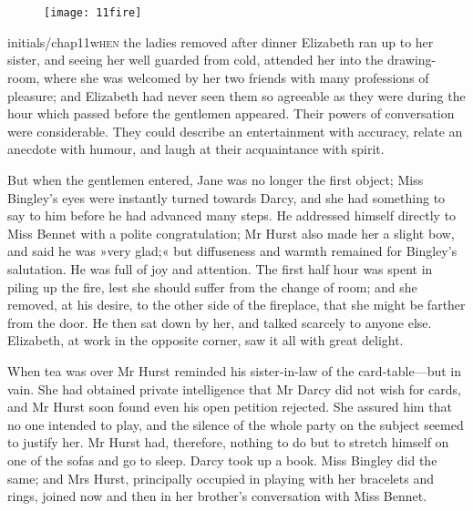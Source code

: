 \chapter[Chapter \thechapter]{}
	
	\begin{figure}[th!]
\centering
\texttt{[image: 11fire]}
\end{figure}

	\lettrine[lines=6,image=true]{initials/chap11w}{hen}  the ladies removed after dinner Elizabeth ran up to her sister, and seeing her well guarded from cold, attended her into the drawing-room, where she was welcomed by her two friends with many professions of pleasure; and Elizabeth had never seen them so agreeable as they were during the hour which passed before the gentlemen appeared. Their powers of conversation were considerable. They could describe an entertainment with accuracy, relate an anecdote with humour, and laugh at their acquaintance with spirit.

But when the gentlemen entered, Jane was no longer the first object; Miss Bingley's eyes were instantly turned towards Darcy, and she had something to say to him before he had advanced many steps. He addressed himself directly to Miss Bennet with a polite congratulation; Mr Hurst also made her a slight bow, and said he was »very glad;« but diffuseness and warmth remained for Bingley's salutation. He was full of joy and attention. The first half hour was spent in piling up the fire, lest she should suffer from the change of room; and she removed, at his desire, to the other side of the fireplace, that she might be farther from the door. He then sat down by her, and talked scarcely to anyone else. Elizabeth, at work in the opposite corner, saw it all with great delight.


When tea was over Mr Hurst reminded his sister-in-law of the card-table—but in vain. She had obtained private intelligence that Mr Darcy did not wish for cards, and Mr Hurst soon found even his open petition rejected. She assured him that no one intended to play, and the silence of the whole party on the subject seemed to justify her. Mr Hurst had, therefore, nothing to do but to stretch himself on one of the sofas and go to sleep. Darcy took up a book. Miss Bingley did the same; and Mrs Hurst, principally occupied in playing with her bracelets and rings, joined now and then in her brother's conversation with Miss Bennet.

